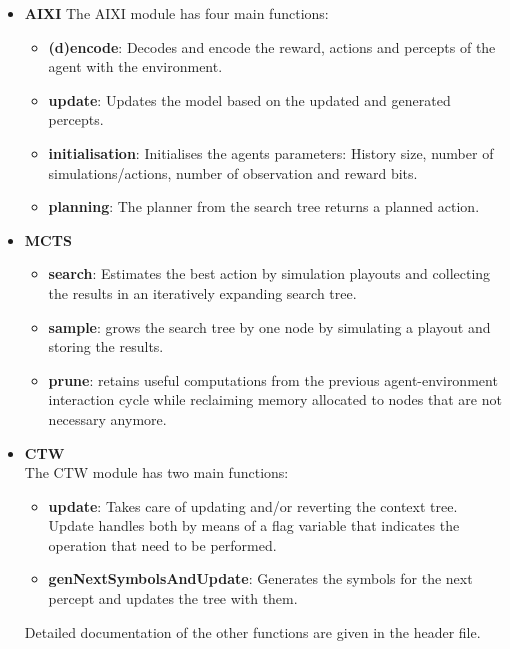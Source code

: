 \documentclass{article}
\theoremstyle{definition}
\newtheorem{primary statistics}[definition]{Primary Statistics}
\newtheorem{auxiliary statistics}[definition]{Auxiliary Statistics}
\begin{document}

\begin{itemize}
    \item \textbf{AIXI} The AIXI module has four main functions: 
    \begin{itemize}
        \item \textbf{(d)encode}: Decodes and encode the reward, actions and percepts of the agent with the environment.
        \item \textbf{update}: Updates the model based on the updated and generated percepts.
        \item \textbf{initialisation}: Initialises the agents parameters: History size, number of simulations/actions, number of observation and reward bits.
        \item \textbf{planning}: The planner from the search tree returns a planned action.
    \end{itemize}
    \item \textbf{MCTS} \begin{itemize} \\
    The MCTS module has three main functions:
        \item \textbf{search}: Estimates the best action by simulation playouts and collecting the results in an iteratively expanding search tree.
        \item \textbf{sample}: grows the search tree by one node by simulating a playout and storing the results.
        \item \textbf{prune}: retains useful computations from the previous agent-environment interaction cycle while reclaiming memory allocated to nodes that are not necessary anymore.
    \end{itemize} 
    \item \textbf{CTW}\\
    The CTW module has two main functions: 
    \begin{itemize}
        \item \textbf{update}: Takes care of updating and/or reverting the context tree. Update handles both by means of a flag variable that indicates the operation that need to be performed.
        \item \textbf{genNextSymbolsAndUpdate}: Generates the symbols for the next percept and updates the tree with them.
    \end{itemize}
    Detailed documentation of the other functions are given in the header file.\\


\end{itemize}
\end{document}
